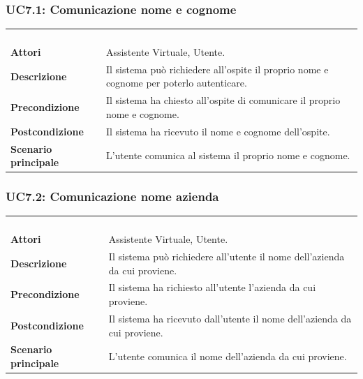\subsubsection{UC7.1: Comunicazione nome e cognome}
\label{UC7.1}
\begin{longtable}{l|p{10cm}}
\rowcolor[gray]{0.8} \multicolumn{2}{c}{} \\
\rowcolor[gray]{0.8} \multicolumn{2}{c}{\textbf{UC7.1 - Comunicazione nome e cognome}} \\
\rowcolor[gray]{0.8} \multicolumn{2}{c}{} \\
\hline
&\\
\textbf{Attori} & Assistente Virtuale, Utente.\\[7pt]
\textbf{Descrizione} & Il sistema può richiedere all'ospite il proprio nome e cognome per poterlo autenticare.\\[7pt]
\textbf{Precondizione} & Il sistema ha chiesto all'ospite di comunicare il proprio nome e cognome.\\[7pt]
\textbf{Postcondizione} & Il sistema ha ricevuto il nome e cognome dell'ospite.\\[7pt]
\textbf{Scenario principale} &L'utente comunica al sistema il proprio nome e cognome. \\[7pt]\hline
\end{longtable}

\subsubsection{UC7.2: Comunicazione nome azienda}
\label{UC7.2}
\begin{longtable}{l|p{10cm}}
\rowcolor[gray]{0.8} \multicolumn{2}{c}{} \\
\rowcolor[gray]{0.8} \multicolumn{2}{c}{\textbf{UC7.2 - Comunicazione nome azienda}} \\
\rowcolor[gray]{0.8} \multicolumn{2}{c}{} \\
\hline
&\\
\textbf{Attori} & Assistente Virtuale, Utente.\\[7pt]
\textbf{Descrizione} & Il sistema può richiedere all'utente il nome dell'azienda da cui proviene.\\[7pt]
\textbf{Precondizione} & Il sistema ha richiesto all'utente l'azienda da cui proviene.\\[7pt]
\textbf{Postcondizione} & Il sistema ha ricevuto dall'utente il nome dell'azienda da cui proviene.\\[7pt]
\textbf{Scenario principale} &L'utente comunica il nome dell'azienda da cui proviene.\\[7pt]\hline
\end{longtable}

